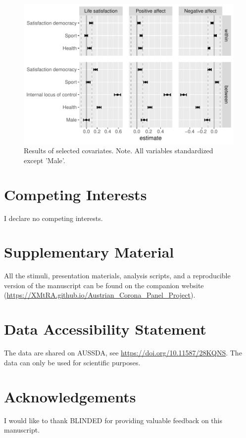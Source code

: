 \documentclass[
  man,mask]{apa7}
\begin{document}
\newpage

\begin{figure}
\includegraphics[width=\textwidth]{manuscript_files/figure-latex/fig-control-1} \caption{Results of selected covariates. Note. All variables standardized except 'Male'.}\label{fig:fig-control}
\end{figure}

\newpage

\hypertarget{competing-interests}{%
\section{Competing Interests}\label{competing-interests}}

I declare no competing interests.

\hypertarget{supplementary-material}{%
\section{Supplementary Material}\label{supplementary-material}}

All the stimuli, presentation materials, analysis scripts, and a reproducible version of the manuscript can be found on the companion website (\url{https://XMtRA.github.io/Austrian_Corona_Panel_Project}).

\hypertarget{data-accessibility-statement}{%
\section{Data Accessibility Statement}\label{data-accessibility-statement}}

The data are shared on AUSSDA, see \url{https://doi.org/10.11587/28KQNS}.
The data can only be used for scientific purposes.

\hypertarget{acknowledgements}{%
\section{Acknowledgements}\label{acknowledgements}}

I would like to thank BLINDED for providing valuable feedback on this manuscript.
\end{document}
